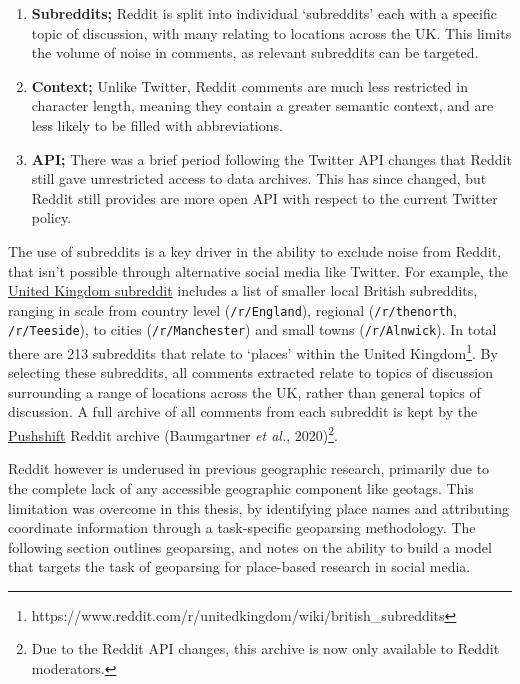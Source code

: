\documentclass[
  letterpaper,
  11pt,
  english,
  onehalfspacing,
  headsepline]{MastersDoctoralThesis}
\providecommand{\tightlist}{%
  \setlength{\itemsep}{0pt}\setlength{\parskip}{0pt}}\usepackage{longtable,booktabs,array}
\begin{document}
\begin{enumerate}
\def\labelenumi{\arabic{enumi}.}
\tightlist
\item
  \textbf{Subreddits;} Reddit is split into individual `subreddits' each
  with a specific topic of discussion, with many relating to locations
  across the UK. This limits the volume of noise in comments, as
  relevant subreddits can be targeted.
\item
  \textbf{Context;} Unlike Twitter, Reddit comments are much less
  restricted in character length, meaning they contain a greater
  semantic context, and are less likely to be filled with abbreviations.
\item
  \textbf{API;} There was a brief period following the Twitter API
  changes that Reddit still gave unrestricted access to data archives.
  This has since changed, but Reddit still provides are more open API
  with respect to the current Twitter policy.
\end{enumerate}

The use of subreddits is a key driver in the ability to exclude noise
from Reddit, that isn't possible through alternative social media like
Twitter. For example, the
\href{https://reddit.com/r/unitedkingdom}{United Kingdom subreddit}
includes a list of smaller local British subreddits, ranging in scale
from country level (\texttt{/r/England}), regional
(\texttt{/r/thenorth}, \texttt{/r/Teeside}), to cities
(\texttt{/r/Manchester}) and small towns (\texttt{/r/Alnwick}). In total
there are 213 subreddits that relate to `places' within the United
Kingdom\footnote{https://www.reddit.com/r/unitedkingdom/wiki/british\_subreddits}.
By selecting these subreddits, all comments extracted relate to topics
of discussion surrounding a range of locations across the UK, rather
than general topics of discussion. A full archive of all comments from
each subreddit is kept by the \href{https://pushshift.io/}{Pushshift}
Reddit archive (Baumgartner \emph{et al.}, 2020)\footnote{Due to the
  Reddit API changes, this archive is now only available to Reddit
  moderators.}.

Reddit however is underused in previous geographic research, primarily
due to the complete lack of any accessible geographic component like
geotags. This limitation was overcome in this thesis, by identifying
place names and attributing coordinate information through a
task-specific geoparsing methodology. The following section outlines
geoparsing, and notes on the ability to build a model that targets the
task of geoparsing for place-based research in social media.
\end{document}
